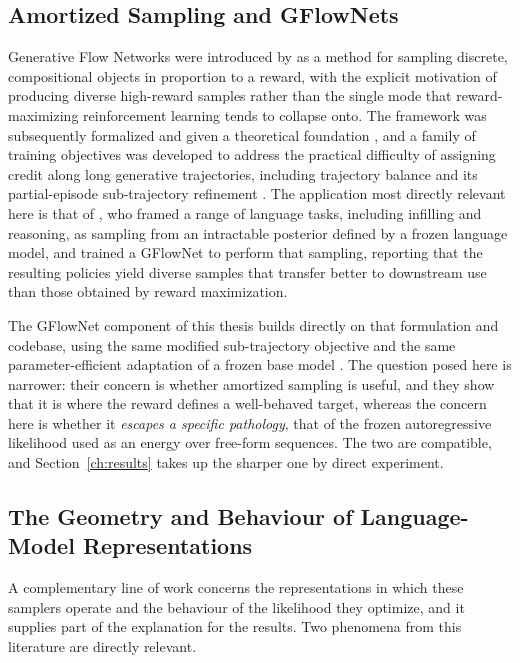 \subsection{Amortized Sampling and GFlowNets}
\label{sec:rel-gflownet}

Generative Flow Networks were introduced by \citet{bengio2021flow} as a method for sampling discrete, compositional objects in proportion to a reward, with the explicit motivation of producing diverse high-reward samples rather than the single mode that reward-maximizing reinforcement learning tends to collapse onto. The framework was subsequently formalized and given a theoretical foundation \citep{bengio2023gflownet}, and a family of training objectives was developed to address the practical difficulty of assigning credit along long generative trajectories, including trajectory balance \citep{malkin2022trajectory} and its partial-episode sub-trajectory refinement \citep{madan2023learning}. The application most directly relevant here is that of \citet{hu2024amortizing}, who framed a range of language tasks, including infilling and reasoning, as sampling from an intractable posterior defined by a frozen language model, and trained a GFlowNet to perform that sampling, reporting that the resulting policies yield diverse samples that transfer better to downstream use than those obtained by reward maximization.

The GFlowNet component of this thesis builds directly on that formulation and codebase, using the same modified sub-trajectory objective and the same parameter-efficient adaptation of a frozen base model \citep{hu2022lora}. The question posed here is narrower: their concern is whether amortized sampling is useful, and they show that it is where the reward defines a well-behaved target, whereas the concern here is whether it \emph{escapes a specific pathology}, that of the frozen autoregressive likelihood used as an energy over free-form sequences. The two are compatible, and Section~\ref{ch:results} takes up the sharper one by direct experiment.

\subsection{The Geometry and Behaviour of Language-Model Representations}
\label{sec:rel-geometry}

A complementary line of work concerns the representations in which these samplers operate and the behaviour of the likelihood they optimize, and it supplies part of the explanation for the results. Two phenomena from this literature are directly relevant.


